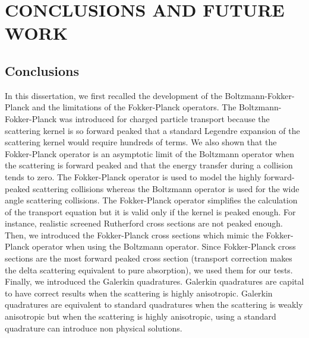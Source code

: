\chapter{\uppercase{Conclusions and future work}}
\section{Conclusions}
In this dissertation, we first recalled the development of the
Boltzmann-Fokker-Planck and the limitations of the Fokker-Planck operators.
The Boltzmann-Fokker-Planck was introduced for charged particle transport
because the scattering kernel is so forward peaked that a standard Legendre
expansion of the scattering kernel would require hundreds of terms. We also
shown that the Fokker-Planck operator is an asymptotic limit of the Boltzmann 
operator when the scattering is forward peaked and that the energy transfer 
during a collision tends to zero. The Fokker-Planck operator is used to model 
the highly forward-peaked scattering collisions whereas the Boltzmann operator 
is used for the wide angle scattering collisions. The Fokker-Planck operator 
simplifies the calculation of the transport equation but it is valid only if 
the kernel is peaked enough. For instance, realistic screened Rutherford 
cross sections are not peaked enough. Then, we introduced the Fokker-Planck 
cross sections which mimic the Fokker-Planck operator when using the Boltzmann
operator. Since Fokker-Planck cross sections are the most forward peaked cross
section (transport correction makes the delta scattering equivalent to pure
absorption), we used them for our tests. Finally, we introduced the Galerkin 
quadratures. Galerkin quadratures are capital to have correct results when 
the scattering is highly anisotropic. Galerkin quadratures are equivalent
to standard quadratures when the scattering is weakly anisotropic but when the
scattering is highly anisotropic, using a standard quadrature can introduce
non physical solutions.

